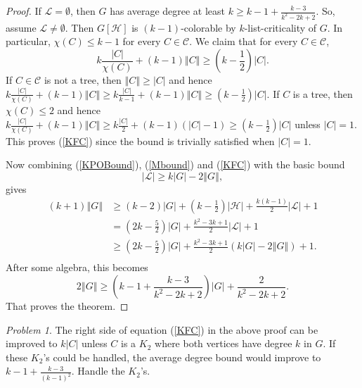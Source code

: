 \documentclass[12pt]{article}
\theoremstyle{plain}
\theoremstyle{definition}
\theoremstyle{remark}
\newtheorem*{problem}{Problem}
\newcommand{\fancy}[1]{\mathcal{#1}}
\newcommand{\C}[1]{\fancy{C}_{#1}}
\renewcommand{\L}{\fancy{L}}
\newcommand{\HH}{\fancy{H}}
\newcommand{\card}[1]{\left|#1\right|}
\newcommand{\size}[1]{\left\Vert#1\right\Vert}
\newcommand{\parens}[1]{\left( #1 \right)}
\def\C{\fancy{C}}
\begin{document}
\begin{proof}
	If $\L = \emptyset$, then $G$ has average degree at least $k \ge k-1 + \frac{k-3}{k^2-2k+2}$.  So, assume $\L \ne \emptyset$.  Then $G[\HH]$ is $(k-1)$-colorable by $k$-list-criticality of $G$. In particular, $\chi(C) \le k-1$ for every $C \in \C$.
	We claim that for every $C \in \C$,
	\begin{equation}
	 k\frac{\card{C}}{\chi(C)} + (k-1)\size{C} \ge \parens{k - \frac12}\card{C}.
	 \label{KFC}
	\end{equation}
	If $C \in \C$ is not a tree, then $\size{C} \ge \card{C}$ and hence $k\frac{\card{C}}{\chi(C)} + (k-1)\size{C} \ge k\frac{\card{C}}{k-1} + (k-1)\size{C} \ge (k - \frac12)\card{C}$.  If $C$ is a tree, then $\chi(C) \le 2$ and hence 
	$k\frac{\card{C}}{\chi(C)} + (k-1)\size{C} \ge k\frac{\card{C}}{2} + (k-1)(\card{C} - 1) \ge (k-\frac12)\card{C}$ unless $\card{C} = 1$.  This proves (\ref{KFC}) since the bound is trivially satisfied when $\card{C} = 1$.
	
	Now combining (\ref{KPOBound}), (\ref{Mbound}) and (\ref{KFC}) with the basic bound
	\begin{equation*}
	  \card{\L} \ge k\card{G} - 2\size{G},
	\end{equation*}	
	gives
	\begin{align*}
	(k+1)\size{G} &\ge (k-2)\card{G} + \parens{k - \frac12}\card{\HH} + \frac{k(k-1)}{2}\card{\L} + 1\\
	&= \parens{2k-\frac52}\card{G} + \frac{k^2 - 3k + 1}{2}\card{\L} + 1\\
	&\ge\parens{2k-\frac52}\card{G} + \frac{k^2 - 3k + 1}{2}\parens{k\card{G} - 2\size{G}} + 1.\\
	\end{align*}
	After some algebra, this becomes
	\begin{equation*}
		2\size{G} \ge \parens{k-1 + \frac{k-3}{k^2 -2k + 2}}\card{G} + \frac{2}{k^2 -2k + 2}.
	\end{equation*}
	That proves the theorem.
\end{proof}



\begin{problem}
The right side of equation (\ref{KFC}) in the above proof can be improved to $k\card{C}$ unless $C$ is a $K_2$ where both vertices have degree $k$ in $G$.  If these $K_2$'s could be handled, the average degree bound would improve to $k-1 + \frac{k-3}{(k-1)^2}$.  Handle the $K_2$'s.
\end{problem}



\end{document}
